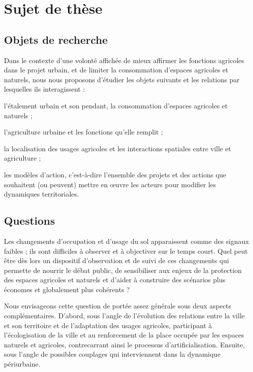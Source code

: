 \page[yes]
\section[sujet]{Sujet de thèse}

\subsection{Objets de recherche}

Dans le contexte d'une volonté affichée de mieux affirmer les fonctions agricoles
dans le projet urbain,
et de limiter la consommation d'espaces agricoles et naturels,
nous nous proposons d'étudier les objets suivants et les relations par lesquelles
ils interagissent :

\startitemize[packed]

\item l'étalement urbain et son pendant, la consommation d'espaces agricoles et naturels ;
\item l'agriculture urbaine et les fonctions qu'elle remplit ;
\item la localisation des usages agricoles
  et les interactions spatiales entre ville et agriculture ;
\item les modèles d'action, c'est-à-dire l'ensemble
  des projets et des actions que souhaitent (ou peuvent) mettre en œuvre
  les acteurs pour modifier les dynamiques territoriales.

\stopitemize

\subsection{Questions}

Les changements d'occupation et d'usage du sol apparaissent comme des signaux faibles ;
ils sont difficiles à observer et à objectiver sur le temps court.
Quel peut être dès lors un dispositif d'observation et de suivi de ces changements
qui permette de nourrir le débat public, de sensibiliser aux enjeux de la protection
des espaces agricoles et naturels et d'aider à construire des scénarios
plus économes et globalement plus cohérents ?

Nous envisageons cette question de portée assez générale
sous deux aspects complémentaires. D'abord, sous l'angle de 
l'évolution des relations entre la ville et son territoire et de l'adaptation
des usages agricoles, participant à l'écologisation de la ville et
au renforcement de la place occupée par les espaces naturels et agricoles,
contrecarrant ainsi le processus d'artificialisation.
Ensuite, sous l'angle de possibles couplages
qui interviennent dans la dynamique périurbaine.

